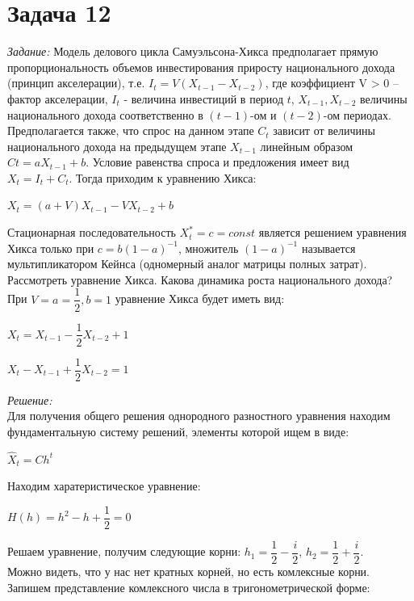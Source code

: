 \documentclass[14pt,fleqn]{extarticle}
\begin{document}
	\section*{Задача 12}
	\textit{Задание:} Модель делового цикла Самуэльсона-Хикса предполагает прямую
	пропорциональность объемов инвестирования приросту национального
	дохода (принцип акселерации), т.е. $I_t = V(X_{t-1} - X_{t-2})$, где коэффициент $\mbox{V > 0}$ -- фактор акселерации, $I_t$ - величина инвестиций в период $t$, $X_{t-1}, X_{t-2}$ величины
	национального дохода соответственно в $(t-1)$-ом и $(t-2)$-ом периодах.
	Предполагается также, что спрос на данном этапе $C_t$ зависит от величины
	национального дохода на предыдущем этапе $X_{t-1}$ линейным образом $Ct = aX_{t-1} + b$. Условие равенства спроса и предложения имеет вид $X_t = I_t + C_t$. Тогда
	приходим к уравнению Хикса:
	\begin{center}
		$X_t = (a+V)X_{t-1} - VX_{t-2} + b$
	\end{center}
	Стационарная последовательность $X_t^* = c = const$ является решением
	уравнения Хикса только при $c = b(1-a)^{-1}$, множитель $(1 - a)^{-1}$ называется
	мультипликатором Кейнса (одномерный аналог матрицы полных затрат).\\
	Рассмотреть уравнение Хикса. Какова динамика роста национального
	дохода?\\
	При $V = a = \dfrac{1}{2}, b = 1$ уравнение Хикса будет иметь вид:\\
	\begin{center}
		$X_t = X_{t-1} - \dfrac{1}{2}X_{t-2} + 1$
	\end{center}
	\begin{center}
		$X_t - X_{t-1} + \dfrac{1}{2}X_{t-2} = 1$
	\end{center}
	\textit{Решение:}\\
	Для получения общего решения однородного разностного уравнения находим фундаментальную систему решений, элементы которой ищем в виде:
	\begin{center}
		$\hat{X}_t = Ch^t$
	\end{center}
	Находим харатеристическое уравнение:
	\begin{center}
		$H(h) = h^2 - h + \dfrac{1}{2} = 0$
	\end{center}
	Решаем уравнение, получим следующие корни: $h_1 = \dfrac{1}{2}-\dfrac{i}{2}$, $h_2 = \dfrac{1}{2} + \dfrac{i}{2}$.\\
	Можно видеть, что у нас нет кратных корней, но есть комлексные корни.
	\newpage
	Запишем представление комлексного числа в тригонометрической форме:
\end{document}
